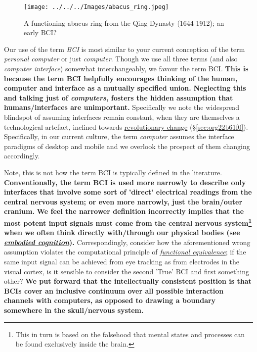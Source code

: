 \documentclass[logo,bsc,singlespacing,parskip]{infthesis}
\begin{document}
\begin{wrapfigure}{r}{0.55\textwidth}
\centering
\texttt{[image: ../../../Images/abacus\_ring.jpeg]}
\caption[Abacus ring; an early BCI]{A functioning abacus ring from the Qing Dynasty (1644-1912); an early BCI?}
\end{wrapfigure}

Our use of the term \emph{BCI} is most similar to your current conception of the term \emph{personal computer} or just \emph{computer}.
Though we use all three terms (and also \emph{computer interface}) somewhat interchangeably, we favour the term BCI.
\textbf{This is because the term BCI helpfully encourages thinking of the human, computer and interface as a mutually specified union.}
\textbf{Neglecting this and talking just of \emph{computers}, fosters the hidden assumption that humans/interfaces are unimportant.}
Specifically we note the widespread blindspot of assuming interfaces remain constant, when they are themselves a technological artefact, inclined towards \hyperref[sec:org22b61f0]{revolutionary change} (\S \ref{sec:org22b61f0}).
Specifically, in our current culture, the term \emph{computer} assumes the interface paradigms of desktop and mobile and we overlook the prospect of them changing accordingly.

Note, this is not how the term BCI is typically defined in the literature.
\textbf{Conventionally, the term BCI is used more narrowly to describe only interfaces that involve some sort of 'direct' electrical readings from the central nervous system; or even more narrowly, just the brain/outer cranium.}
\textbf{We feel the narrower definition incorrectly implies that the most potent input signals must come from the central nervous system\footnote{This in turn is based on the falsehood that mental states and processes can be found exclusively inside the brain.} when we often think directly with/through our physical bodies (see \emph{\hyperref[orgb456c86]{embodied cognition}}).}
Correspondingly, consider how the aforementioned wrong assumption violates the computational principle of \emph{\hyperref[org7c2148f]{functional equivalence}}; if the same input signal can be achieved from eye tracking as from electrodes in the visual cortex, is it sensible to consider the second 'True' BCI and first something other?
\textbf{We put forward that the intellectually consistent position is that BCIs cover an inclusive continuum over all possible interaction channels with computers, as opposed to drawing a boundary somewhere in the skull/nervous system.}
\end{document}
